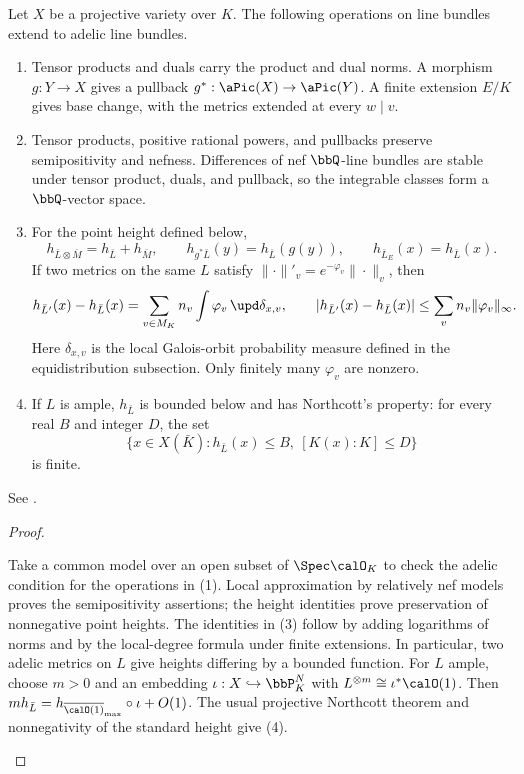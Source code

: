 \begin{proposition}[label=\labelNFM{prop:fundamental-properties-of-adelic-line-bundle}, status=draft, tag=0000000]
	\begin{latexmathchange}
	Let $X$ be a projective variety over $K$.
	The following operations on line bundles extend to adelic line bundles.
	\begin{enumerate}
		\item Tensor products and duals carry the product and dual norms.
		      A morphism $g:Y \to X$ gives a pullback $g^*:\aPic(X) \to \aPic(Y)$.
		      A finite extension $E/K$ gives base change, with the metrics extended at every $w \mid v$.
		\item Tensor products, positive rational powers, and pullbacks preserve semipositivity and nefness.
		      Differences of nef $\bbQ$-line bundles are stable under tensor product, duals, and pullback, so the integrable classes form a $\bbQ$-vector space.
		\item For the point height defined below,
		      \[ h_{\bar L\otimes\bar M} = h_{\bar L}+h_{\bar M}, \qquad h_{g^*\bar L}(y) = h_{\bar L}(g(y)), \qquad h_{\bar L_E}(x) = h_{\bar L}(x). \]
		      If two metrics on the same $L$ satisfy $\|\cdot\|'_v = e^{-\varphi_v}\|\cdot\|_v$, then
		      \[ h_{\bar L'}(x)-h_{\bar L}(x) = \sum_{v \in M_K} n_v\int\varphi_v\,\upd\delta_{x,v}, \qquad |h_{\bar L'}(x)-h_{\bar L}(x)| \leq \sum_v n_v\|\varphi_v\|_\infty. \]
		      Here $\delta_{x,v}$ is the local Galois-orbit probability measure defined in the equidistribution subsection.
		      Only finitely many $\varphi_v$ are nonzero.
		\item If $L$ is ample, $h_{\bar L}$ is bounded below and has Northcott's property:
		      for every real $B$ and integer $D$, the set
		      \[ \{x \in X(\bar K):h_{\bar L}(x) \leq B,\ [K(x):K] \leq D\} \]
		      is finite.
	\end{enumerate}
	See \cite[Appendices~A.1.1--A.1.2 and A.5.2]{Yuan-Zhang-2026-AdelicLineBundles}.
	\end{latexmathchange}
\end{proposition}

\begin{proof}
	\leavevmode\par
	\begin{latexmathchange}
	Take a common model over an open subset of $\Spec\calO_K$ to check the adelic condition for the operations in (1).
	Local approximation by relatively nef models proves the semipositivity assertions; the height identities prove preservation of nonnegative point heights.
	The identities in (3) follow by adding logarithms of norms and by the local-degree formula under finite extensions.
	In particular, two adelic metrics on $L$ give heights differing by a bounded function.
	For $L$ ample, choose $m > 0$ and an embedding $\iota:X \hookrightarrow \bbP^N_K$ with $L^{\otimes m} \cong \iota^*\calO(1)$.
	Then $m h_{\bar L} = h_{\overline{\calO(1)}_{\max}}\circ\iota+O(1)$.
	The usual projective Northcott theorem and nonnegativity of the standard height give (4).
	\end{latexmathchange}
\end{proof}

